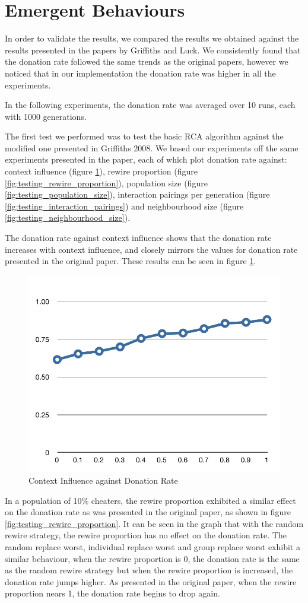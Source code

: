 \section{Emergent Behaviours}

In order to validate the results, we compared the results we obtained against the results presented in the papers by Griffiths and Luck. We consistently found that the donation rate followed the same trends as the original papers, however we noticed that in our implementation the donation rate was higher in all the experiments.

In the following experiments, the donation rate was averaged over 10 runs, each with 1000 generations.

The first test we performed was to test the basic RCA algorithm against the modified one presented in Griffiths 2008. We based our experiments off the same experiments presented in the paper, each of which plot donation rate against: context influence (figure \ref{fig:testing_context_influence}), rewire proportion (figure \ref{fig:testing_rewire_proportion}), population size (figure \ref{fig:testing_population_size}), interaction pairings per generation (figure \ref{fig:testing_interaction_pairings}) and neighbourhood size (figure \ref{fig:testing_neighbourhood_size}).

The donation rate against context influence shows that the donation rate increases with context influence, and closely mirrors the values for donation rate presented in the original paper. These results can be seen in figure \ref{fig:testing_context_influence}.

\begin{figure}[h]
	\centering
	\includegraphics[width=0.4\linewidth]{img/testing_context_influence.pdf}
	\caption{Context Influence against Donation Rate}
	\label{fig:testing_context_influence}
\end{figure}

In a population of 10\% cheaters, the rewire proportion exhibited a similar effect on the donation rate as was presented in the original paper, as shown in figure \ref{fig:testing_rewire_proportion}. It can be seen in the graph that with the random rewire strategy, the rewire proportion has no effect on the donation rate. The random replace worst, individual replace worst and group replace worst exhibit a similar behaviour, when the rewire proportion is 0, the donation rate is the same as the random rewire strategy but when the rewire proportion is increased, the donation rate jumps higher. As presented in the original paper, when the rewire proportion nears 1, the donation rate begins to drop again.

